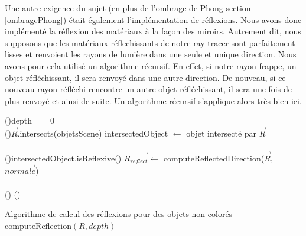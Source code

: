\documentclass[../../Rapport RayTracer.tex]{subfiles}
\begin{document}
Une autre exigence du sujet (en plus de l'ombrage de Phong section \ref{ombragePhong}) était également l'implémentation de réflexions. Nous avons donc implémenté la réflexion des matériaux à la façon des miroirs. Autrement dit, nous supposons que les matériaux réflechissants de notre ray tracer sont parfaitement lisses et renvoient les rayons de lumière dans une seule et unique direction. Nous avons pour cela utilisé un algorithme récursif. En effet, si notre rayon frappe, un objet réfléchissant, il sera renvoyé dans une autre direction. De nouveau, si ce nouveau rayon réfléchi rencontre un autre objet réfléchissant, il sera une fois de plus renvoyé et ainsi de suite. Un algorithme récursif s'applique alors très bien ici.

\begin{algorithm}[H]
	\DontPrintSemicolon

	\If(){depth == 0}
	{
	}
	\hfill\\

	\If(){$\overrightarrow{R}$.intersects(objetsScene)}
	{
		intersectedObject $\gets$ objet intersecté par $\overrightarrow{R}$\\\hfill\\

		\If(){intersectedObject.isReflexive()}
		{
			$\overrightarrow{R_{reflect}} \gets$ computeReflectedDirection($\overrightarrow{R}$, $\overrightarrow{normale}$)\\\hfill\\

		}
		\Else()
		{
		}
	}
	\Else()
	{
	}

	\caption{Algorithme de calcul des réflexions pour des objets non colorés - computeReflection$(R, depth)$}
	\label{algoReflections}
\end{algorithm}
\end{document}
